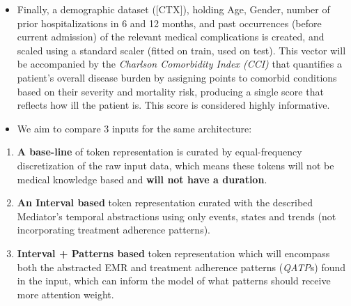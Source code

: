 \documentclass[
]{article}
\begin{document}
\begin{itemize}
\item
  Finally, a demographic dataset ({[}CTX{]}), holding Age, Gender,
  number of prior hospitalizations in 6 and 12 months, and past
  occurrences (before current admission) of the relevant medical
  complications is created, and scaled using a standard scaler (fitted
  on train, used on test). This vector will be accompanied by the
  \emph{Charlson Comorbidity Index (CCI)} that quantifies a patient's
  overall disease burden by assigning points to comorbid conditions
  based on their severity and mortality risk, producing a single score
  that reflects how ill the patient is. This score is considered highly
  informative.
\item
  We aim to compare 3 inputs for the same architecture:
\end{itemize}

\begin{enumerate}
\def\labelenumi{\arabic{enumi}.}
\item
  \textbf{A base-line} of token representation is curated by
  equal-frequency discretization of the raw input data, which means
  these tokens will not be medical knowledge based and \textbf{will not
  have a duration}.
\item
  \textbf{An Interval based} token representation curated with the
  described Mediator's temporal abstractions using only events, states
  and trends (not incorporating treatment adherence patterns).
\item
  \textbf{Interval + Patterns based} token representation which will
  encompass both the abstracted EMR and treatment adherence patterns
  (\emph{QATP}s) found in the input, which can inform the model of what
  patterns should receive more attention weight.
\end{enumerate}
\end{document}
